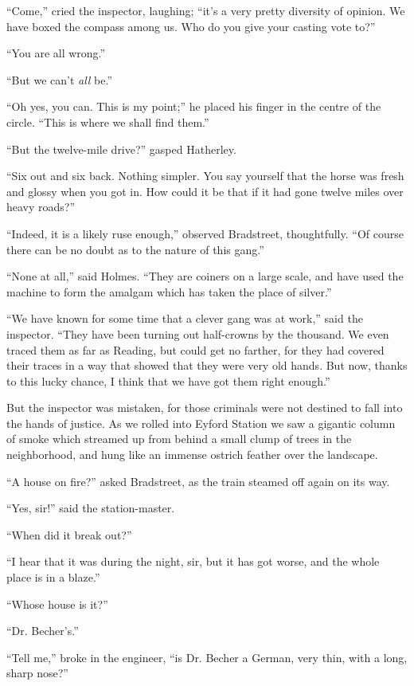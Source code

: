 “Come,” cried the inspector, laughing; “it’s a very pretty
diversity of opinion. We have boxed the compass among us.
Who do you give your casting vote to?”

“You are all wrong.”

“But we can’t \textit{all} be.”

“Oh yes, you can. This is my point;” he placed his finger
in the centre of the circle. “This is where we shall find
them.”

“But the twelve-mile drive?” gasped Hatherley.

“Six out and six back. Nothing simpler. You say yourself
that the horse was fresh and glossy when you got in.
How could it be that if it had gone twelve miles over heavy
roads?”

“Indeed, it is a likely ruse enough,” observed Bradstreet,
thoughtfully. “Of course there can be no doubt as to the
nature of this gang.”

“None at all,” said Holmes. “They are coiners on a large
scale, and have used the machine to form the amalgam which
has taken the place of silver.”

“We have known for some time that a clever gang was at
work,” said the inspector. “They have been turning out
half-crowns by the thousand. We even traced them as far as
Reading, but could get no farther, for they had covered their
traces in a way that showed that they were very old hands.
But now, thanks to this lucky chance, I think that we have
got them right enough.”

But the inspector was mistaken, for those criminals were
not destined to fall into the hands of justice. As we rolled
into Eyford Station we saw a gigantic column of smoke which
streamed up from behind a small clump of trees in the neighborhood,
and hung like an immense ostrich feather over the
landscape.

“A house on fire?” asked Bradstreet, as the train steamed
off again on its way.

“Yes, sir!” said the station-master.

“When did it break out?”

“I hear that it was during the night, sir, but it has got
worse, and the whole place is in a blaze.”

“Whose house is it?”

“Dr. Becher’s.”

“Tell me,” broke in the engineer, “is Dr. Becher a German,
very thin, with a long, sharp nose?”


